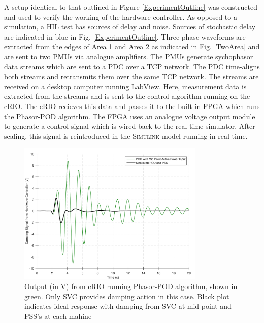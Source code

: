 \documentclass[conference]{IEEEtran}
\begin{document}
A setup identical to that outlined in Figure \ref{ExperimentOutline} was constructed and used to verify the working of the hardware controller. As opposed to a simulation, a HIL test has sources of delay and noise. Sources of stochastic delay are indicated in blue in Fig. \ref{ExperimentOutline}. Three-phase waveforms are extracted from the edges of Area 1 and Area 2 as indicated in Fig. \ref{TwoArea} and are sent to two PMUs via analogue amplifiers. The PMUs generate sychophasor data streams which are sent to a PDC over a TCP network. The PDC time-aligns both streams and retransmits them over the same TCP network. The streams are received on a desktop computer running LabView. Here, measurement data is extracted from the streams and is sent to the control algorithm running on the cRIO. The cRIO recieves this data and passes it to the built-in FPGA which runs the Phasor-POD algorithm. The FPGA uses an analogue voltage output module to generate a control signal which is wired back to the real-time simulator. After scaling, this signal is reintroduced in the \textsc{Simulink} model running in real-time.\\
\begin{figure}[!h]
\includegraphics[width=3.5in]{SVC_ResponseComparison_Labelled.pdf} 
\caption{Output (in V) from cRIO running Phasor-POD algorithm, shown in green. Only SVC provides damping action in this case. Black plot indicates ideal response with damping from SVC at mid-point and PSS's at each mahine}
\label{HILGraph}
\end{figure}
\end{document}
